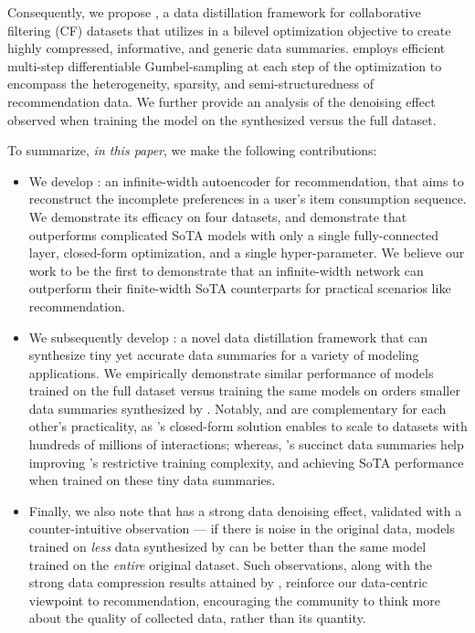 \documentclass{article}
\begin{document}
Consequently, we propose \sampler, a data distillation framework for collaborative filtering (CF) datasets that utilizes \model in a bilevel optimization objective to create highly compressed, informative, and generic data summaries. \sampler employs efficient multi-step differentiable Gumbel-sampling \cite{gumbel} at each step of the optimization to encompass the heterogeneity, sparsity, and semi-structuredness of recommendation data.
We further provide an analysis of the denoising effect observed when training the model on the synthesized versus the full dataset.

To summarize, \emph{in this paper}, we make the following contributions:
\begin{itemize}[leftmargin=.3in]
    \item We develop \model: an infinite-width autoencoder for recommendation, that aims to reconstruct the incomplete preferences in a user's item consumption sequence. We demonstrate its efficacy on four datasets, and demonstrate that \model outperforms complicated SoTA models with only a single fully-connected layer, closed-form optimization, and a single hyper-parameter. We believe our work to be the first to demonstrate that an infinite-width network can outperform their finite-width SoTA counterparts for practical scenarios like recommendation.
    
    \item We subsequently develop \sampler: a novel data distillation framework that can synthesize tiny yet accurate data summaries for a variety of modeling applications. We empirically demonstrate similar performance of models trained on the full dataset versus training the same models on  orders smaller data summaries synthesized by \sampler.
Notably, \sampler and \model are complementary for each other's practicality, as \model's closed-form solution enables \sampler to scale to datasets with hundreds of millions of interactions; whereas, \sampler's succinct data summaries help improving \model's restrictive training complexity, and achieving SoTA performance when trained on these tiny data summaries.
    
    \item Finally, we also note that \sampler has a strong data denoising effect, validated with a counter-intuitive observation --- if there is noise in the original data, models trained on \emph{less} data synthesized by \sampler can be better than the same model trained on the \emph{entire} original dataset. 
Such observations, along with the strong data compression results attained by \sampler, reinforce our data-centric viewpoint to recommendation, encouraging the community to think more about the quality of collected data, rather than its quantity. \end{itemize}
\end{document}
